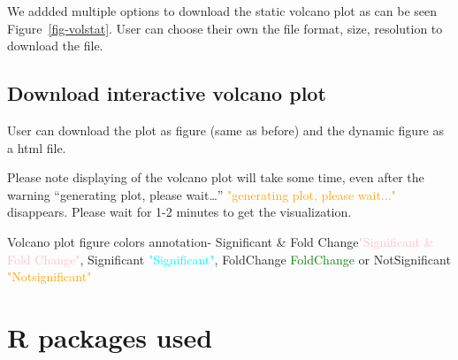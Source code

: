 \documentclass[
  a4paper,
  DIV=11,
  numbers=noendperiod,
  oneside,
  open=any]{scrreport}
\begin{document}
We addded multiple options to download the static volcano plot as can be
seen Figure~\ref{fig-volstat}. User can choose their own the file
format, size, resolution to download the file.

\subsection{Download interactive volcano
plot}\label{download-interactive-volcano-plot}

User can download the plot as figure (same as before) and the dynamic
figure as a html file.

\begin{tcolorbox}[enhanced jigsaw, coltitle=black, colback=white, title=\textcolor{quarto-callout-note-color}{\faInfo}\hspace{0.5em}{Note}, leftrule=.75mm, titlerule=0mm, colframe=quarto-callout-note-color-frame, toprule=.15mm, opacityback=0, arc=.35mm, breakable, rightrule=.15mm, colbacktitle=quarto-callout-note-color!10!white, bottomtitle=1mm, opacitybacktitle=0.6, left=2mm, bottomrule=.15mm, toptitle=1mm]

Please note displaying of the volcano plot will take some time, even
after the warning {``generating plot, please wait\ldots{}''}
\textcolor{orange}{"generating plot, please wait..."} disappears. Please
wait for 1-2 minutes to get the visualization.

\end{tcolorbox}

\begin{tcolorbox}[enhanced jigsaw, coltitle=black, colback=white, title=\textcolor{quarto-callout-tip-color}{\faLightbulb}\hspace{0.5em}{Tip}, leftrule=.75mm, titlerule=0mm, colframe=quarto-callout-tip-color-frame, toprule=.15mm, opacityback=0, arc=.35mm, breakable, rightrule=.15mm, colbacktitle=quarto-callout-tip-color!10!white, bottomtitle=1mm, opacitybacktitle=0.6, left=2mm, bottomrule=.15mm, toptitle=1mm]

Volcano plot figure colors annotation- {Significant \& Fold
Change}\textcolor{pink}{"Significant \& Fold Change"}, {Significant}
\textcolor{cyan}{"Significant"}, {FoldChange}
\textcolor{green}{FoldChange} or {NotSignificant}
\textcolor{orange}{"Notsignificant"}

\end{tcolorbox}

\section{R packages used}\label{r-packages-used-1}
\end{document}
